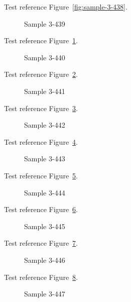 Test reference Figure~\ref{fig:sample-3-438}.

\begin{figure}[tbhp]
\caption{Sample 3-439}
\label{fig:sample-3-439}
\end{figure}

Test reference Figure~\ref{fig:sample-3-439}.

\begin{figure}[tbhp]
\caption{Sample 3-440}
\label{fig:sample-3-440}
\end{figure}

Test reference Figure~\ref{fig:sample-3-440}.

\begin{figure}[tbhp]
\caption{Sample 3-441}
\label{fig:sample-3-441}
\end{figure}

Test reference Figure~\ref{fig:sample-3-441}.

\begin{figure}[tbhp]
\caption{Sample 3-442}
\label{fig:sample-3-442}
\end{figure}

Test reference Figure~\ref{fig:sample-3-442}.

\begin{figure}[tbhp]
\caption{Sample 3-443}
\label{fig:sample-3-443}
\end{figure}

Test reference Figure~\ref{fig:sample-3-443}.

\begin{figure}[tbhp]
\caption{Sample 3-444}
\label{fig:sample-3-444}
\end{figure}

Test reference Figure~\ref{fig:sample-3-444}.

\begin{figure}[tbhp]
\caption{Sample 3-445}
\label{fig:sample-3-445}
\end{figure}

Test reference Figure~\ref{fig:sample-3-445}.

\begin{figure}[tbhp]
\caption{Sample 3-446}
\label{fig:sample-3-446}
\end{figure}

Test reference Figure~\ref{fig:sample-3-446}.

\begin{figure}[tbhp]
\caption{Sample 3-447}
\label{fig:sample-3-447}
\end{figure}

